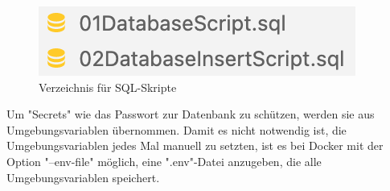 \begin{figure}
    \centering
    \includegraphics{media/Docker/SQLScriptDir.png}
    \caption{Verzeichnis für SQL-Skripte}
    \label{fig:SQLScriptDir}
\end{figure}

Um "Secrets" wie das Passwort zur Datenbank zu schützen, werden sie aus Umgebungsvariablen übernommen.
Damit es nicht notwendig ist, die Umgebungsvariablen jedes Mal manuell zu setzten, ist es bei Docker mit der Option "{\ttfamily --env-file}" möglich, eine ".env"-Datei anzugeben, die alle Umgebungsvariablen speichert. \label{par:dockerEnvFile} 

